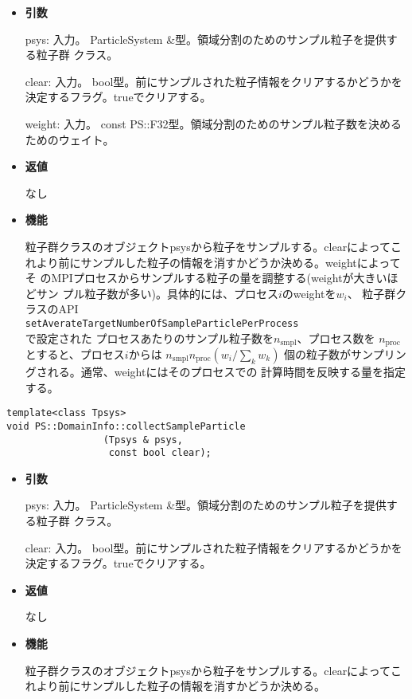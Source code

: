 \begin{itemize}

\item {\bf 引数}

psys: 入力。 ParticleSystem \&型。領域分割のためのサンプル粒子を提供する粒子群
クラス。

clear: 入力。 bool型。前にサンプルされた粒子情報をクリアするかどうかを
決定するフラグ。trueでクリアする。

weight: 入力。 const PS::F32型。領域分割のためのサンプル粒子数を決める
ためのウェイト。

\item {\bf 返値}

なし

\item {\bf 機能}

粒子群クラスのオブジェクトpsysから粒子をサンプルする。clearによってこ
れより前にサンプルした粒子の情報を消すかどうか決める。weightによってそ
のMPIプロセスからサンプルする粒子の量を調整する(weightが大きいほどサン
プル粒子数が多い)。具体的には、プロセス$i$のweightを$w_{i}$、
粒子群クラスのAPI \\
\texttt{setAverateTargetNumberOfSampleParticlePerProcess}\\
で設定された
プロセスあたりのサンプル粒子数を$n_{\mathrm{smpl}}$、プロセス数を
$n_{\mathrm{proc}}$とすると、プロセス$i$からは
$n_{\mathrm{smpl}}n_{\mathrm{proc}}(w_{i}/\sum_{k}w_{k})$
個の粒子数がサンプリングされる。通常、weightにはそのプロセスでの
計算時間を反映する量を指定する。

\end{itemize}

\begin{screen}
\begin{verbatim}
template<class Tpsys>
void PS::DomainInfo::collectSampleParticle
                 (Tpsys & psys,
                  const bool clear);
\end{verbatim}
\end{screen}

\begin{itemize}

\item {\bf 引数}

psys: 入力。 ParticleSystem \&型。領域分割のためのサンプル粒子を提供する粒子群
クラス。

clear: 入力。 bool型。前にサンプルされた粒子情報をクリアするかどうかを
決定するフラグ。trueでクリアする。

\item {\bf 返値}

なし

\item {\bf 機能}

粒子群クラスのオブジェクトpsysから粒子をサンプルする。clearによってこ
れより前にサンプルした粒子の情報を消すかどうか決める。

\end{itemize}

